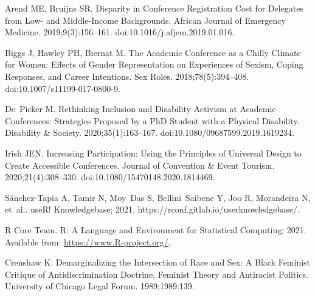 \documentclass[10pt,letterpaper]{article}
\begin{document}

%
\begin{thebibliography}{10}

Arend ME, Bruijns SR.
\newblock Disparity in Conference Registration Cost for Delegates from Low- and
  Middle-Income Backgrounds.
\newblock African Journal of Emergency Medicine. 2019;9(3):156--161.
\newblock doi:{10.1016/j.afjem.2019.01.016}.

Biggs J, Hawley PH, Biernat M.
\newblock The {{Academic Conference}} as a {{Chilly Climate}} for {{Women}}:
  Effects of {{Gender Representation}} on {{Experiences}} of {{Sexism}},
  {{Coping Responses}}, and {{Career Intentions}}.
\newblock Sex Roles. 2018;78(5):394--408.
\newblock doi:{10.1007/s11199-017-0800-9}.

De~Picker M.
\newblock Rethinking Inclusion and Disability Activism at Academic Conferences:
  Strategies Proposed by a {{PhD}} Student with a Physical Disability.
\newblock Disability \& Society. 2020;35(1):163--167.
\newblock doi:{10.1080/09687599.2019.1619234}.

Irish JEN.
\newblock Increasing Participation: Using the Principles of Universal Design to
  Create Accessible Conferences.
\newblock Journal of Convention \& Event Tourism. 2020;21(4):308--330.
\newblock doi:{10.1080/15470148.2020.1814469}.

{S{\'a}nchez-Tapia} A, Tamir N, Moy~Das S, Bellini~Saibene Y, Joo R, Morandeira
  N, et~al.. {{useR}}! {{Knowledgebase}}; 2021.
\newblock https://rconf.gitlab.io/userknowledgebase/.

{R Core Team}. R: A Language and Environment for Statistical Computing; 2021.
\newblock Available from: \url{https://www.R-project.org/}.

Crenshaw K.
\newblock Demarginalizing the {{Intersection}} of {{Race}} and {{Sex}}: A
  {{Black Feminist Critique}} of {{Antidiscrimination Doctrine}}, {{Feminist
  Theory}} and {{Antiracist Politics}}.
\newblock University of Chicago Legal Forum. 1989;1989:139.


\end{thebibliography}
\end{document}

